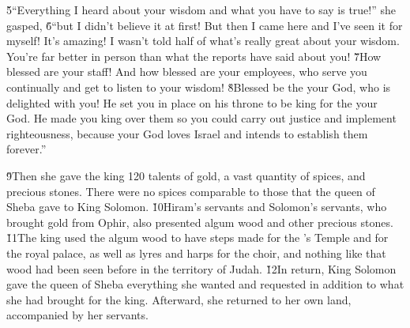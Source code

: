 \v{5}``Everything I heard about your wisdom and what you have to say is true!'' she gasped, \v{6}``but I didn't believe it at first! But then I came here and I've seen it for myself! It's amazing! I wasn't told half of what's really great about your wisdom. You're far better in person than what the reports have said about you! \v{7}How blessed are your staff! And how blessed are your employees, who serve you continually and get to listen to your wisdom! \v{8}Blessed be the  your God, who is delighted with you! He set you in place on his throne to be king for the  your God. He made you king over them so you could carry out justice and implement righteousness, because your God loves Israel and intends to establish them forever.''

\v{9}Then she gave the king 120 talents of gold, a vast quantity of spices, and precious stones. There were no spices comparable to those that the queen of Sheba gave to King Solomon. \v{10}Hiram's servants and Solomon's servants, who brought gold from Ophir, also presented algum wood and other precious stones. \v{11}The king used the algum wood to have steps made for the 's Temple and for the royal palace, as well as lyres and harps for the choir, and nothing like that wood had been seen before in the territory of Judah. \v{12}In return, King Solomon gave the queen of Sheba everything she wanted and requested in addition to what she had brought for the king. Afterward, she returned to her own land, accompanied by her servants.

